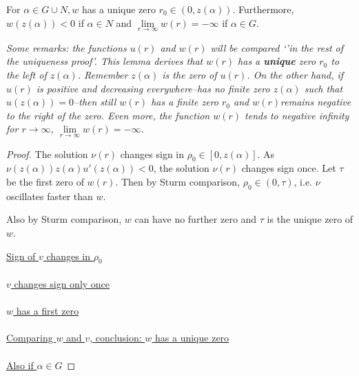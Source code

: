 \begin{lemma}\label{wq}For $\alpha\in G\cup N,w$ has a unique zero $r_0\in(0,z(\alpha)).$ Furthermore, $w(z(\alpha))<0$ if $\alpha\in N$ and $\underset{r\to\infty}{\lim}w(r)=-\infty$ if $\alpha\in G$.

\emph{Some remarks: the functions $u(r)$ and $w(r)$ will be compared `'in the rest of the uniqueness proof'. This lemma derives that $w(r)$ has a \textbf{unique} zero $r_0$ to the left of $z(\alpha)$. Remember $z(\alpha)$ is the zero of $u(r)$. On the other hand, if $u(r)$ is positive and decreasing everywhere--has no finite zero $z(\alpha)$ such that $u(z(\alpha))=0$--then still $w(r)$ has a finite zero $r_0$ and $w(r)$remains negative to the right of the zero. Even more, the function $w(r)$ tends to negative infinity for $r\to\infty$, $\underset{r\to\infty}{\lim}w(r)=-\infty$.}
\begin{proof}
The solution $\nu(r)$ changes sign in $\rho_0\in[0,z(\alpha)]$. As $\nu(z(\alpha))z(\alpha)u'(z(\alpha))<0$, the solution $\nu(r)$ changes sign once. Let $\tau$ be the first zero of $w(r)$. Then by Sturm comparison, $\rho_0\in(0,\tau)$, i.e. $\nu$ oscillates faster than $w$.

Also by Sturm comparison, $w$ can have no further zero and $\tau$ is the unique zero of $w$.

\underline{Sign of $v$ changes in $\rho_0$} \\ \\

\underline{$v$ changes sign only once} \\ \\

\underline{$w$ has a first zero} \\ \\

\underline{Comparing $w$ and $v$, conclusion: $w$ has a unique zero} \\ \\

\underline{Also if $\alpha\in G$}


\end{proof}
\end{lemma}
